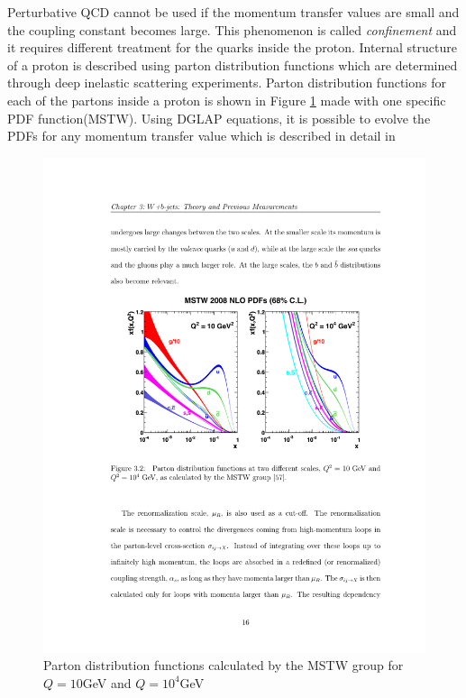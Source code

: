 	\par Perturbative QCD cannot be used if the momentum transfer values are small and the coupling constant becomes large. This phenomenon is called \textit{confinement} and it requires different treatment for the quarks inside the proton. Internal structure of a proton is described using parton distribution functions which  are determined through deep inelastic scattering experiments. Parton distribution functions for each of the partons inside a proton is shown in Figure \ref{fig:MSTW} made with one specific PDF function(MSTW). Using DGLAP equations, it is possible to evolve the PDFs for any momentum transfer value which is described in detail in \cite{Campbell:2006wx} 

\begin{figure}[htbp]
	\centering
		\includegraphics{Figures/MSTW.pdf}
	\caption[Parton distribution functions for different momentum transfers]{Parton distribution functions calculated by the MSTW group for $Q=10$GeV and $Q=10^4$GeV \citep{Martin:2009iq}}
	\label{fig:MSTW}
\end{figure}

